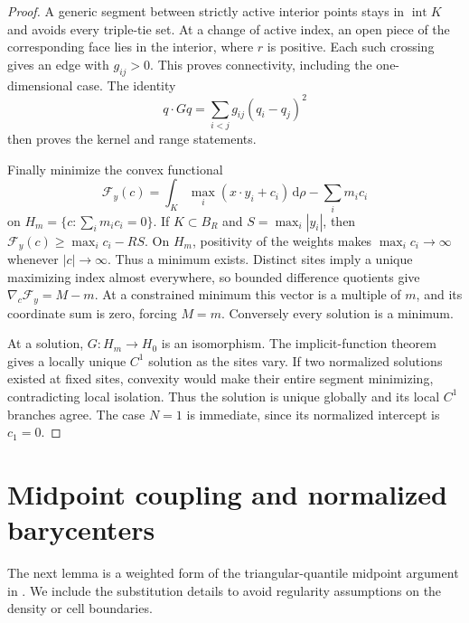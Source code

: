 \documentclass[11pt]{article}
\numberwithin{equation}{section}
\theoremstyle{remark}
\newcommand{\dd}{\,\mathrm d}
\newcommand{\interior}{\operatorname{int}}
\begin{document}
\begin{proof}
A generic segment between strictly active interior points stays in $\interior K$ and avoids every triple-tie set. At a change of active index, an open piece of the corresponding face lies in the interior, where $r$ is positive. Each such crossing gives an edge with $g_{ij}>0$. This proves connectivity, including the one-dimensional case. The identity
\[
 q\cdot Gq=\sum_{i<j}g_{ij}(q_i-q_j)^2
\]
then proves the kernel and range statements.

Finally minimize the convex functional
\[
 \mathcal F_y(c)=\int_K\max_i(x\cdot y_i+c_i)\dd\rho
                    -\sum_i m_ic_i
\]
on $H_m=\{c:\sum_i m_ic_i=0\}$. If $K\subset B_R$ and $S=\max_i|y_i|$, then $\mathcal F_y(c)\ge\max_i c_i-RS$. On $H_m$, positivity of the weights makes $\max_i c_i\to\infty$ whenever $|c|\to\infty$. Thus a minimum exists. Distinct sites imply a unique maximizing index almost everywhere, so bounded difference quotients give $\nabla_c\mathcal F_y=M-m$. At a constrained minimum this vector is a multiple of $m$, and its coordinate sum is zero, forcing $M=m$. Conversely every solution is a minimum.

At a solution, $G:H_m\to H_0$ is an isomorphism. The implicit-function theorem gives a locally unique $C^1$ solution as the sites vary. If two normalized solutions existed at fixed sites, convexity would make their entire segment minimizing, contradicting local isolation. Thus the solution is unique globally and its local $C^1$ branches agree. The case $N=1$ is immediate, since its normalized intercept is $c_1=0$.
\end{proof}

\section{Midpoint coupling and normalized barycenters}\label{sec:midpoint}
The next lemma is a weighted form of the triangular-quantile midpoint argument in \cite{OpenAI2026}. We include the substitution details to avoid regularity assumptions on the density or cell boundaries.
\end{document}
